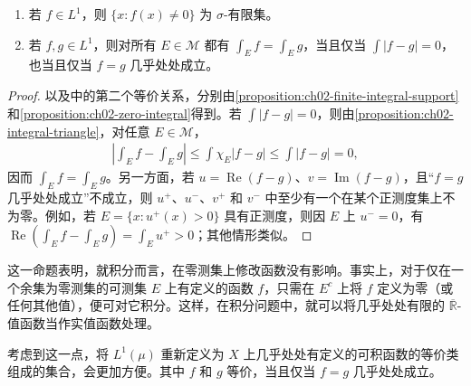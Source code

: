\documentclass[../../main.tex]{subfiles}%
\begin{document}
\begin{proposition}\label{proposition:ch02-lone-ae-equivalence}
\begin{enumerate}
\item\label{item:ch02-lone-sigma-finite-support} 若 $f\in L^1$，则 $\{x:f(x)\ne0\}$ 为 $\sigma$-有限集。
\item\label{item:ch02-lone-equality} 若 $f,g\in L^1$，则对所有 $E\in\mathscr{M}$ 都有 $\int_E f=\int_E g$，当且仅当 $\int|f-g|=0$，也当且仅当 $f=g$ 几乎处处成立。
\end{enumerate}
\end{proposition}
\begin{proof}
以及中的第二个等价关系，分别由\cref{proposition:ch02-finite-integral-support}和\cref{proposition:ch02-zero-integral}得到。若 $\int|f-g|=0$，则由\cref{proposition:ch02-integral-triangle}，对任意 $E\in\mathscr{M}$，
\begin{align*}
\left|\int_E f-\int_E g\right|\le\int\chi_E|f-g|\le\int|f-g|=0,
\end{align*}
因而 $\int_E f=\int_E g$。另一方面，若 $u=\operatorname{Re}(f-g)$、$v=\operatorname{Im}(f-g)$，且“$f=g$ 几乎处处成立”不成立，则 $u^+$、$u^-$、$v^+$ 和 $v^-$ 中至少有一个在某个正测度集上不为零。例如，若 $E=\{x:u^+(x)>0\}$ 具有正测度，则因 $E$ 上 $u^-=0$，有 $\operatorname{Re}(\int_E f-\int_E g)=\int_E u^+>0$；其他情形类似。
\end{proof}
\begin{remark}
这一命题表明，就积分而言，在零测集上修改函数没有影响。事实上，对于仅在一个余集为零测集的可测集 $E$ 上有定义的函数 $f$，只需在 $E^c$ 上将 $f$ 定义为零（或任何其他值），便可对它积分。这样，在积分问题中，就可以将几乎处处有限的 $\overline{\mathbb{R}}$-值函数当作实值函数处理。
\end{remark}
\begin{definition}[$L^1$ 空间]\label{definition:ch02-lone-equivalence-classes}
考虑到这一点，将 $L^1(\mu)$ 重新定义为 $X$ 上几乎处处有定义的可积函数的等价类组成的集合，会更加方便。其中 $f$ 和 $g$ 等价，当且仅当 $f=g$ 几乎处处成立。
\end{definition}
\end{document}
